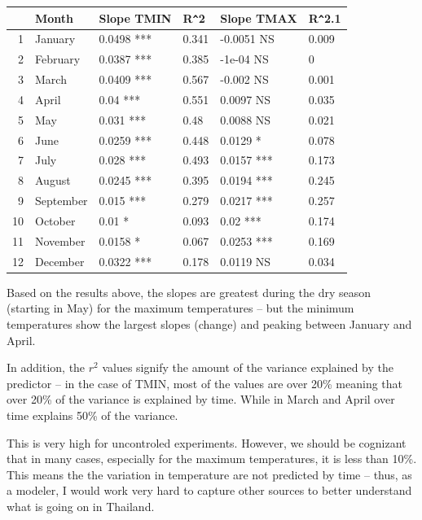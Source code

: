\documentclass{article}\usepackage[]{graphicx}\usepackage[]{color}
\makeatletter
\newenvironment{kframe}{%
 \def\at@end@of@kframe{}%
 \ifinner\ifhmode%
  \def\at@end@of@kframe{\end{minipage}}%
  \begin{minipage}{\columnwidth}%
 \fi\fi%
 \def\FrameCommand##1{\hskip\@totalleftmargin \hskip-\fboxsep
 \colorbox{shadecolor}{##1}\hskip-\fboxsep
     \hskip-\linewidth \hskip-\@totalleftmargin \hskip\columnwidth}%
 \MakeFramed {\advance\hsize-\width
   \@totalleftmargin\z@ \linewidth\hsize
   \@setminipage}}%
 {\par\unskip\endMakeFramed%
 \at@end@of@kframe}
\makeatother
\begin{document}
\begin{enumerate}
\begin{kframe}
\begin{alltt}
\end{alltt}
\end{kframe}%
\begin{table}[ht]
\centering
\begin{tabular}{rlllll}
  \hline
 & Month & Slope TMIN & R\verb|^|2 & Slope TMAX & R\verb|^|2.1 \\ 
  \hline
1 & January & 0.0498 *** & 0.341 & -0.0051 NS & 0.009 \\ 
  2 & February & 0.0387 *** & 0.385 & -1e-04 NS & 0 \\ 
  3 & March & 0.0409 *** & 0.567 & -0.002 NS & 0.001 \\ 
  4 & April & 0.04 *** & 0.551 & 0.0097 NS & 0.035 \\ 
  5 & May & 0.031 *** & 0.48 & 0.0088 NS & 0.021 \\ 
  6 & June & 0.0259 *** & 0.448 & 0.0129 * & 0.078 \\ 
  7 & July & 0.028 *** & 0.493 & 0.0157 *** & 0.173 \\ 
  8 & August & 0.0245 *** & 0.395 & 0.0194 *** & 0.245 \\ 
  9 & September & 0.015 *** & 0.279 & 0.0217 *** & 0.257 \\ 
  10 & October & 0.01 * & 0.093 & 0.02 *** & 0.174 \\ 
  11 & November & 0.0158 * & 0.067 & 0.0253 *** & 0.169 \\ 
  12 & December & 0.0322 *** & 0.178 & 0.0119 NS & 0.034 \\ 
   \hline
\end{tabular}
\end{table}


Based on the results above, the slopes are greatest during the dry season (starting in May) for the maximum temperatures -- but the minimum temperatures show the largest slopes (change) and peaking between January and April.  

In addition, the $r^2$ values signify the amount of the variance explained by the predictor -- in the case of TMIN, most of the values are over 20\% meaning that over 20\% of the variance is explained by time. While in March and April over time explains 50\% of the variance. 

This is very high for uncontroled experiments. However, we should be cognizant that in many cases, especially for the maximum temperatures, it is less than 10\%. This means the the variation in temperature are not predicted by time -- thus, as a modeler, I would work very hard to capture other sources to better understand what is going on in Thailand. 


\end{enumerate}
\end{document}
